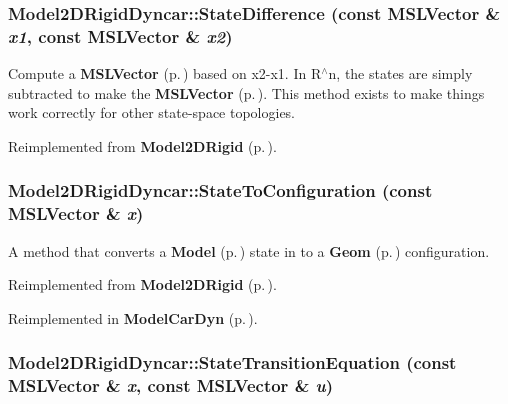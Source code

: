 \subsubsection{ Model2DRigid\-Dyncar::State\-Difference (const {\bf MSLVector} \& {\em x1}, const {\bf MSLVector} \& {\em x2})\hspace{0.3cm}{\tt  [virtual]}}\label{classModel2DRigidDyncar_a7}


Compute a {\bf MSLVector} {\rm (p.\,\pageref{classMSLVector})} based on x2-x1. In R$^\wedge$n, the states are simply subtracted to make the {\bf MSLVector} {\rm (p.\,\pageref{classMSLVector})}. This method exists to make things work correctly for other state-space topologies.



Reimplemented from {\bf Model2DRigid} {\rm (p.\,\pageref{classModel2DRigid_a5})}.
\subsubsection{ Model2DRigid\-Dyncar::State\-To\-Configuration (const {\bf MSLVector} \& {\em x})\hspace{0.3cm}{\tt  [virtual]}}\label{classModel2DRigidDyncar_a3}


A method that converts a {\bf Model} {\rm (p.\,\pageref{classModel})} state in to a {\bf Geom} {\rm (p.\,\pageref{classGeom})} configuration.



Reimplemented from {\bf Model2DRigid} {\rm (p.\,\pageref{classModel2DRigid_a7})}.

Reimplemented in {\bf Model\-Car\-Dyn} {\rm (p.\,\pageref{classModelCarDyn_a2})}.
\subsubsection{ Model2DRigid\-Dyncar::State\-Transition\-Equation (const {\bf MSLVector} \& {\em x}, const {\bf MSLVector} \& {\em u})\hspace{0.3cm}{\tt  [virtual]}}\label{classModel2DRigidDyncar_a4}


